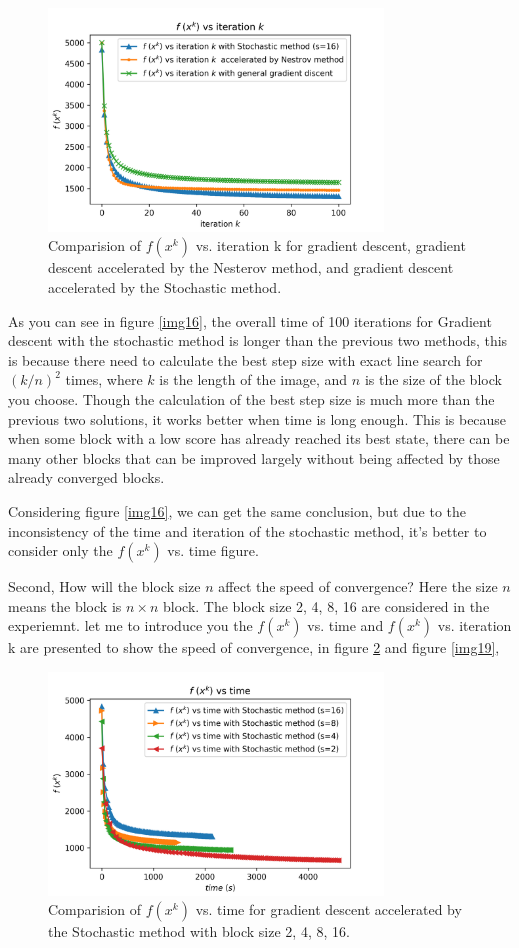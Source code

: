 \documentclass{article}
\begin{document}
\begin{figure}[h]
  \includegraphics[width=3.5in]{pic17.png}
  \centering
  \caption{Comparision of $f(x^{k})$ vs. iteration k for gradient descent, gradient descent accelerated by the Nesterov method, and gradient descent accelerated by the Stochastic method.}
  \label{img17}
\end{figure}

As you can see in figure \ref{img16}, the overall time of 100 iterations for Gradient descent with the stochastic method is longer than the previous two methods, this is because there need to calculate the best step size with exact line search for $(k/n)^2$ times, where $k$ is the length of the image, and $n$ is the size of the block you choose. Though the calculation of the best step size is much more than the previous two solutions, it works better when time is long enough. This is because when some block with a low score has already reached its best state, there can be many other blocks that can be improved largely without being affected by those already converged blocks.

Considering figure \ref{img16}, we can get the same conclusion, but due to the inconsistency of the time and iteration of the stochastic method, it’s better to consider only the  $f(x^{k})$ vs. time figure.

Second, How will the block size $n$ affect the speed of convergence? Here the size $n$ means the block is $n \times n$ block. The block size 2, 4, 8, 16 are considered in the experiemnt. let me to introduce you the $f(x^{k})$ vs. time and  $f(x^{k})$ vs. iteration k are presented to show the speed of convergence, in figure \ref{img18} and figure \ref{img19},

\begin{figure}[h]
  \includegraphics[width=3.5in]{pic18.png}
  \centering
  \caption{Comparision of $f(x^{k})$ vs. time for gradient descent accelerated by the Stochastic method with block size 2, 4, 8, 16.}
  \label{img18}
\end{figure}
\end{document}
